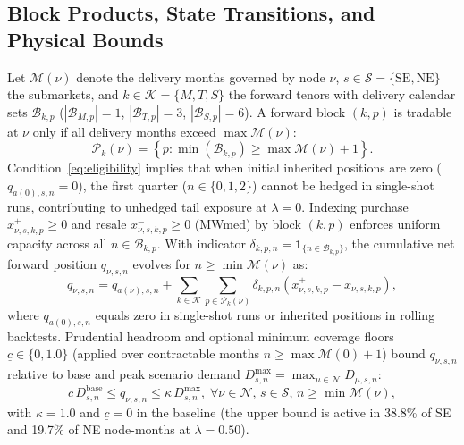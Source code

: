 \documentclass[10pt,journal]{IEEEtran}
\begin{document}
\subsection{Block Products, State Transitions, and Physical Bounds}
Let $\mathcal{M}(\nu)$ denote the delivery months governed by node $\nu$, $s \in \mathcal{S} = \{\text{SE}, \text{NE}\}$ the submarkets, and $k \in \mathcal{K} = \{M, T, S\}$ the forward tenors with delivery calendar sets $\mathcal{B}_{k,p}$ ($|\mathcal{B}_{M,p}|=1$, $|\mathcal{B}_{T,p}|=3$, $|\mathcal{B}_{S,p}|=6$). A forward block $(k, p)$ is tradable at $\nu$ only if all delivery months exceed $\max \mathcal{M}(\nu)$:
\begin{equation}
\mathcal{P}_k(\nu) = \left\{ p : \min(\mathcal{B}_{k,p}) \ge \max \mathcal{M}(\nu) + 1 \right\}.
\label{eq:eligibility}
\end{equation}
Condition~\eqref{eq:eligibility} implies that when initial inherited positions are zero ($q_{a(0),s,n} = 0$), the first quarter ($n \in \{0,1,2\}$) cannot be hedged in single-shot runs, contributing to unhedged tail exposure at $\lambda = 0$. Indexing purchase $x^+_{\nu,s,k,p} \ge 0$ and resale $x^-_{\nu,s,k,p} \ge 0$ (MWmed) by block $(k,p)$ enforces uniform capacity across all $n \in \mathcal{B}_{k,p}$. With indicator $\delta_{k,p,n} = \mathbf{1}_{\{n \in \mathcal{B}_{k,p}\}}$, the cumulative net forward position $q_{\nu,s,n}$ evolves for $n \ge \min \mathcal{M}(\nu)$ as:
\begin{equation}
q_{\nu,s,n} = q_{a(\nu),s,n} + \sum_{k \in \mathcal{K}} \sum_{p \in \mathcal{P}_k(\nu)} \delta_{k,p,n} \left( x^+_{\nu,s,k,p} - x^-_{\nu,s,k,p} \right),
\label{eq:state_q}
\end{equation}
where $q_{a(0),s,n}$ equals zero in single-shot runs or inherited positions in rolling backtests. Prudential headroom and optional minimum coverage floors $\underline{c} \in \{0, 1.0\}$ (applied over contractable months $n \ge \max\mathcal{M}(0)+1$) bound $q_{\nu,s,n}$ relative to base and peak scenario demand $D^{\max}_{s,n} = \max_{\mu \in \mathcal{N}} D_{\mu,s,n}$:
\begin{equation}
\underline{c}\,D^{\text{base}}_{s,n}\le q_{\nu,s,n}\le\kappa\,D^{\max}_{s,n},\;\forall \nu\in\mathcal{N},\,s\in\mathcal{S},\,n\ge\min\mathcal{M}(\nu),
\label{eq:physical_bound}
\end{equation}
with $\kappa = 1.0$ and $\underline{c} = 0$ in the baseline (the upper bound is active in 38.8\% of SE and 19.7\% of NE node-months at $\lambda = 0.50$).
\end{document}
